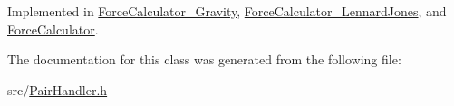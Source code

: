 Implemented in \hyperlink{classForceCalculator__Gravity_a8f79c8d0ef3621a646288a195bf2e75a}{Force\-Calculator\-\_\-\-Gravity}, \hyperlink{classForceCalculator__LennardJones_a153d67ac2a42b1e237c103e5f63b4461}{Force\-Calculator\-\_\-\-Lennard\-Jones}, and \hyperlink{classForceCalculator_a0469e873f4deb9145bc134fabdafe4de}{Force\-Calculator}.



The documentation for this class was generated from the following file\-:\begin{DoxyCompactItemize}
\item 
src/\hyperlink{PairHandler_8h}{Pair\-Handler.\-h}\end{DoxyCompactItemize}
